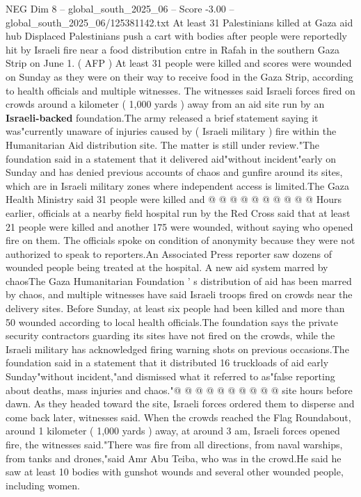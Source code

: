 \begin{textsample}{NEG Dim 8 – global\_south\_2025\_06 – Score -3.00 – global\_south\_2025\_06/125381142.txt}  \label{ex:f8_neg_035}
At least 31 Palestinians killed at Gaza aid hub Displaced Palestinians push a cart with bodies after people were reportedly hit by Israeli fire near a food distribution cntre in Rafah in the southern Gaza Strip on June 1. ( AFP ) At least 31 people were killed and scores were wounded on Sunday as they were on their way to receive food in the Gaza Strip, according to health officials and multiple witnesses.
The witnesses said Israeli forces fired on crowds around a kilometer ( 1,000 yards ) away from an aid site run by an \textbf{Israeli-backed} foundation.The army released a brief statement saying it was"currently unaware of injuries caused by ( Israeli military ) fire within the Humanitarian Aid distribution site.
The matter is still under review."The foundation said in a statement that it delivered aid"without incident"early on Sunday and has denied previous accounts of chaos and gunfire around its sites, which are in Israeli military zones where independent access is limited.The Gaza Health Ministry said 31 people were killed and @ @ @ @ @ @ @ @ @ @ Hours earlier, officials at a nearby field hospital run by the Red Cross said that at least 21 people were killed and another 175 were wounded, without saying who opened fire on them.
The officials spoke on condition of anonymity because they were not authorized to speak to reporters.An Associated Press reporter saw dozens of wounded people being treated at the hospital.
A new aid system marred by chaosThe Gaza Humanitarian Foundation ' s distribution of aid has been marred by chaos, and multiple witnesses have said Israeli troops fired on crowds near the delivery sites.
Before Sunday, at least six people had been killed and more than 50 wounded according to local health officials.The foundation says the private security contractors guarding its sites have not fired on the crowds, while the Israeli military has acknowledged firing warning shots on previous occasions.The foundation said in a statement that it distributed 16 truckloads of aid early Sunday"without incident,"and dismissed what it referred to as"false reporting about deaths, mass injuries and chaos."@ @ @ @ @ @ @ @ @ @ site hours before dawn.
As they headed toward the site, Israeli forces ordered them to disperse and come back later, witnesses said.
When the crowds reached the Flag Roundabout, around 1 kilometer ( 1,000 yards ) away, at around 3 am, Israeli forces opened fire, the witnesses said."There was fire from all directions, from naval warships, from tanks and drones,"said Amr Abu Teiba, who was in the crowd.He said he saw at least 10 bodies with gunshot wounds and several other wounded people, including women.

\end{textsample}
